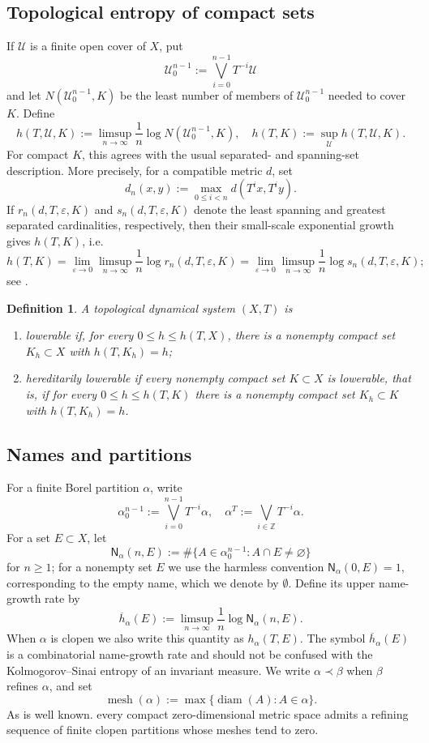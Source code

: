 \documentclass[10pt,a4paper]{amsart}
\newcommand{\Z}{\mathbb Z}
\newcommand{\cU}{\mathcal U}
\newcommand{\join}{\bigvee}
\newcommand{\mesh}{\operatorname{mesh}}
\newcommand{\Nname}{\mathsf N}
\DeclareMathOperator{\diam}{diam}
\newtheorem{definition}[theorem]{Definition}
\numberwithin{equation}{section}
\begin{document}
	\subsection{Topological entropy of compact sets}
	
	If $\cU$ is a finite open cover of $X$, put
	\[
	\cU_0^{n-1}:=\join_{i=0}^{n-1}T^{-i}\cU
	\]
	and let $N(\cU_0^{n-1},K)$ be the least number of members of
	$\cU_0^{n-1}$ needed to cover $K$. Define
	\[
	h(T,\cU,K)
	:=
	\limsup_{n\to\infty}
	\frac1n\log N(\cU_0^{n-1},K),
	\quad
	h(T,K):=\sup_{\cU}h(T,\cU,K).
	\]
	For compact $K$, this agrees with the usual separated- and spanning-set
	description. More precisely, for a compatible metric $d$, set
	\[
	d_n(x,y):=\max_{0\leq i<n}d(T^ix,T^iy).
	\]
	If $r_n(d,T,\varepsilon,K)$ and $s_n(d,T,\varepsilon,K)$ denote the least
	spanning and greatest separated cardinalities, respectively, then their
	small-scale exponential growth gives $h(T,K)$, i.e. 
	\[h(T,K)=\lim_{\varepsilon\to 0}\limsup_{n\to\infty}\frac{1}{n}\log r_n(d,T,\varepsilon,K)=\lim_{\varepsilon\to 0}\limsup_{n\to\infty}\frac{1}{n}\log s_n(d,T,\varepsilon,K);\] see
	\cite{Bowen1973,Misiurewicz2004}.
	
	\begin{definition}
		\label{def:lowerable}
		A topological dynamical system $(X,T)$ is
		\begin{enumerate}
			\item \emph{lowerable} if, for every $0\leq h\leq h(T,X)$, there is a
			nonempty compact set $K_h\subset X$ with $h(T,K_h)=h$;
			\item \emph{hereditarily lowerable} if every nonempty compact set
			$K\subset X$ is lowerable, that is, if for every
			$0\leq h\leq h(T,K)$ there is a nonempty compact set
			$K_h\subset K$ with $h(T,K_h)=h$.
		\end{enumerate}
	\end{definition}
	
	\subsection{Names and partitions}
	
	For a finite Borel partition $\alpha$, write
	\[
	\alpha_0^{n-1}:=\join_{i=0}^{n-1}T^{-i}\alpha,
	\quad
	\alpha^T:=\join_{i\in\Z}T^{-i}\alpha.
	\]
	For a set $E\subset X$, let
	\[
	\Nname_\alpha(n,E)
	:=
	\#\{A\in\alpha_0^{n-1}:A\cap E\neq\varnothing\}
	\]
	for $n\geq1$; for a nonempty set $E$ we use the harmless convention
	$\Nname_\alpha(0,E)=1$, corresponding to the empty name, which we denote by $\emptyset$.  Define its upper
	name-growth rate by
	\[
	\overline h_\alpha(E)
	:=
	\limsup_{n\to\infty}\frac1n\log\Nname_\alpha(n,E).
	\]
	When $\alpha$ is clopen we also write this quantity as
	$h_\alpha(T,E)$. The symbol $\overline h_\alpha(E)$ is a combinatorial
	name-growth rate and should not be confused with the Kolmogorov--Sinai entropy
	of an invariant measure. We write $\alpha\prec\beta$ when $\beta$ refines
	$\alpha$, and set
	\[
	\mesh(\alpha):=\max\{\diam(A):A\in\alpha\}.
	\]
	As is well known. every compact zero-dimensional metric space admits a refining sequence of
	finite clopen partitions whose meshes tend to zero.
\end{document}
